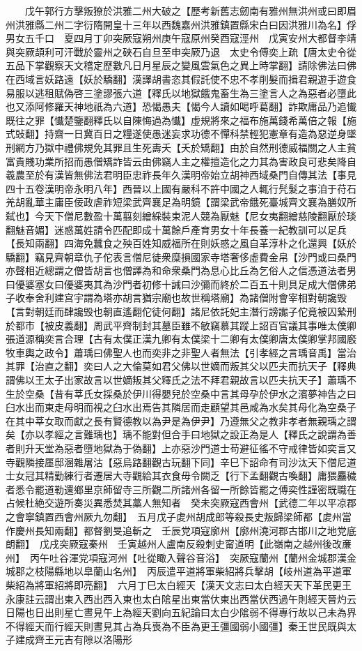 　　戊午郭行方擊叛獠於洪雅二州大破之【歷考新舊志劒南有雅州無洪州或曰即眉州洪雅縣二州二字衍隋開皇十三年以西魏嘉州洪雅鎮置縣宋白曰因洪雅川為名】俘男女五千口　夏四月丁卯突厥寇朔州庚午寇原州癸酉寇涇州　戊寅安州大都督李靖與突厥頡利可汗戰於靈州之硤石自旦至申突厥乃退　太史令傅奕上疏【唐太史令從五品下掌觀察天文稽定歷數凡日月星辰之變風雲氣色之異上時掌翻】請除佛法曰佛在西域言妖路遠【妖於驕翻】漢譯胡書恣其假託使不忠不孝削髮而揖君親遊手遊食易服以逃租賦偽啓三塗謬張六道【釋氏以地獄餓鬼畜生為三塗言人之為惡者必墮此也又添阿修羅天神地祇為六道】恐愒愚夫【愒今人讀如喝呼葛翻】詐欺庸品乃追懴既往之罪【懴楚鑒翻釋氏以自陳悔過為懴】虛規將來之福布施萬錢希萬倍之報【施式䜴翻】持齋一日冀百日之糧遂使愚迷妄求功德不憚科禁輕犯憲章有造為惡逆身墜刑網方乃獄中禮佛規免其罪且生死夀夭【夭於矯翻】由於自然刑德威福關之人主貧富貴賤功業所招而愚僧矯詐皆云由佛竊人主之權擅造化之力其為害政良可悲矣降自羲農至於有漢皆無佛法君明臣忠祚長年久漢明帝始立胡神西域桑門自傳其法【事見四十五卷漢明帝永明八年】西晉以上國有嚴科不許中國之人輒行髠髮之事洎于苻石羌胡亂華主庸臣佞政虐祚短梁武齊襄足為明鏡【謂梁武帝餓死臺城齊文襄為膳奴所弑也】今天下僧尼數盈十萬翦刻繒綵裝束泥人競為厭魅【尼女夷翻繒慈陵翻厭於琰翻魅音媚】迷惑萬姓請令匹配即成十萬餘戶產育男女十年長養一紀教訓可以足兵【長知兩翻】四海免蠶食之殃百姓知威福所在則妖惑之風自革淳朴之化還興【妖於驕翻】竊見齊朝章仇子佗表言僧尼徒衆糜損國家寺塔奢侈虛費金帛【沙門或曰桑門亦聲相近總謂之僧皆胡言也僧譯為和命衆桑門為息心比丘為乞俗人之信憑道法者男曰優婆塞女曰優婆夷其為沙門者初修十誡曰沙彌而終於二百五十則具足成大僧佛弟子收奉舍利建宫宇謂為塔亦胡言猶宗廟也故世稱塔廟】為諸僧附會宰相對朝讒毁【言對朝廷而肆讒毁也朝直遙翻佗徒何翻】諸尼依託妃主潛行謗讟子佗竟被囚縶刑於都市【被皮義翻】周武平齊制封其墓臣雖不敏竊慕其蹤上詔百官議其事唯太僕卿張道源稱奕言合理【古有太僕正漢九卿有太僕梁十二卿有太僕卿唐太僕卿掌邦國廏牧車輿之政令】蕭瑀曰佛聖人也而奕非之非聖人者無法【引孝經之言瑀音禹】當治其罪【治直之翻】奕曰人之大倫莫如君父佛以世嫡而叛其父以匹夫而抗天子【釋典謂佛以王太子出家故言以世嫡叛其父釋氏之法不拜君親故言以匹夫抗天子】蕭瑀不生於空桑【昔有莘氏女採桑於伊川得嬰兒於空桑中言其母孕於伊水之濱夢神告之曰臼水出而東走母明而視之臼水出焉告其隣居而走顧望其邑咸為水矣其母化為空桑子在其中莘女取而獻之長有賢德教以為尹是為伊尹】乃遵無父之教非孝者無親瑀之謂矣【亦以孝經之言難瑀也】瑀不能對但合手曰地獄之設正為是人【釋氏之說謂為善者則升天堂為惡者墮地獄為于偽翻】上亦惡沙門道士苟避征徭不守戒律皆如奕言又寺觀隣接㕓邸溷雜屠沽【惡烏路翻觀古玩翻下同】辛巳下詔命有司沙汰天下僧尼道士女冠其精勤練行者遷居大寺觀給其衣食毋令闕乏【行下孟翻觀古喚翻】庸猥麤穢者悉令罷道勒還鄉里京師留寺三所觀二所諸州各留一所餘皆罷之傅奕性謹密既職在占候杜絶交遊所奏災異悉焚其藁人無知者　癸未突厥寇西會州【武德二年以平凉郡之會寧鎮置西會州厥九勿翻】　五月戊子䖍州胡成郎等殺長史叛歸梁師都【䖍州當作慶州長知兩翻】都督劉旻追斬之　壬辰党項寇廓州【廓州澆河郡古邯川之地党底朗翻】　戊戌突厥寇秦州　壬寅越州人盧南反殺刺史甯道明【此嶺南之越州後改亷州】　丙午吐谷渾党項寇河州【吐從瞰入聲谷音浴】　突厥寇蘭州【蘭州金城郡漢金城郡之枝陽縣地以臯蘭山名州】　丙辰遣平道將軍柴紹將兵擊胡【岐州道為平道軍柴紹為將軍紹將即亮翻】　六月丁巳太白經天【漢天文志曰太白經天天下革民更王永康註云謂出東入西出西入東也太白隂星出東當㐲東出西當伏西過午則經天晉灼云日陽也日出則星亡晝見午上為經天劉向五紀論曰太白少隂弱不得專行故以己未為界不得經天而行經天則晝見其占為兵喪為不臣為更王彊國弱小國彊】秦王世民既與太子建成齊王元吉有隙以洛陽形